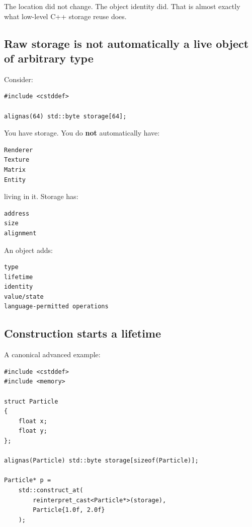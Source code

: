 The location did not change. The object identity did. That is almost exactly what low-level C++ storage reuse does.

\subsection{Raw storage is not automatically a live object of arbitrary type}\label{05-engine-i-ch002-raw-storage-is-not-automatically-a-live-object-of-arbitrary-type}

\hypertarget{05-engine-i-ch002-raw-storage-is-not-automatically-a-live-object-of-arbitrary-type}{}

Consider:

\begin{verbatim}
#include <cstddef>

alignas(64) std::byte storage[64];
\end{verbatim}

You have storage. You do \textbf{not} automatically have:

\begin{verbatim}
Renderer
Texture
Matrix
Entity
\end{verbatim}

living in it. Storage has:

\begin{verbatim}
address
size
alignment
\end{verbatim}

An object adds:

\begin{verbatim}
type
lifetime
identity
value/state
language-permitted operations
\end{verbatim}

\subsection{Construction starts a lifetime}\label{05-engine-i-ch002-construction-starts-a-lifetime}

\hypertarget{05-engine-i-ch002-construction-starts-a-lifetime}{}

A canonical advanced example:

\begin{verbatim}
#include <cstddef>
#include <memory>

struct Particle
{
    float x;
    float y;
};

alignas(Particle) std::byte storage[sizeof(Particle)];

Particle* p =
    std::construct_at(
        reinterpret_cast<Particle*>(storage),
        Particle{1.0f, 2.0f}
    );
\end{verbatim}

